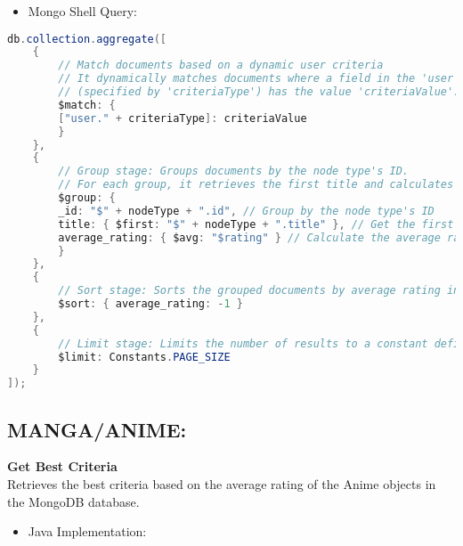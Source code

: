 \begin{itemize}
    \item Mongo Shell Query:
\end{itemize}

\begin{mdframed}[style=customstyle]
\begin{lstlisting}[language=java]
db.collection.aggregate([
    {
        // Match documents based on a dynamic user criteria
        // It dynamically matches documents where a field in the 'user' object 
        // (specified by 'criteriaType') has the value 'criteriaValue'.
        $match: {
        ["user." + criteriaType]: criteriaValue
        }
    },
    {
        // Group stage: Groups documents by the node type's ID.
        // For each group, it retrieves the first title and calculates the average rating.
        $group: {
        _id: "$" + nodeType + ".id", // Group by the node type's ID
        title: { $first: "$" + nodeType + ".title" }, // Get the first title in the group
        average_rating: { $avg: "$rating" } // Calculate the average rating for the group
        }
    },
    {
        // Sort stage: Sorts the grouped documents by average rating in descending order.
        $sort: { average_rating: -1 }
    },
    {
        // Limit stage: Limits the number of results to a constant defined by 'Constants.PAGE_SIZE'.
        $limit: Constants.PAGE_SIZE
    }
]);\end{lstlisting}
\end{mdframed}

\subsection*{MANGA/ANIME:}
\textbf{Get Best Criteria}\\
Retrieves the best criteria based on the average rating of the Anime objects in the MongoDB database.
\begin{itemize}
    \item Java Implementation:
\end{itemize}

